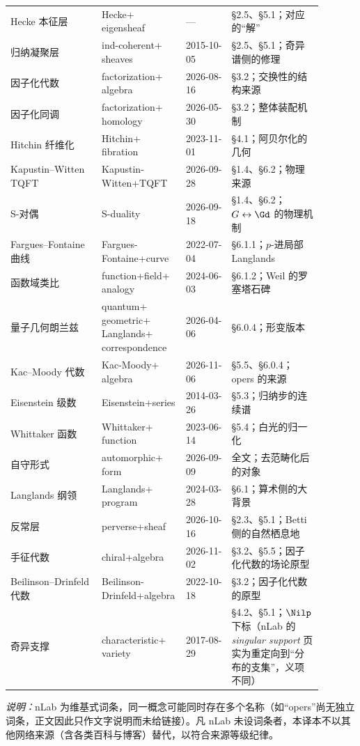 {\begin{longtable}{@{}>{\raggedright\arraybackslash}p{0.26\linewidth}>{\raggedright\arraybackslash}p{0.24\linewidth}>{\raggedright\arraybackslash}p{0.13\linewidth}>{\raggedright\arraybackslash}p{0.26\linewidth}@{}}
Hecke 本征层 & Hecke+​\allowbreak eigensheaf & — & §2.5、§5.1；对应的“解” \\
归纳凝聚层 & ind-coherent+​\allowbreak sheaves & \mbox{2015-10-05} & §2.5、§5.1；奇异谱侧的修理 \\
因子化代数 & factorization+​\allowbreak algebra & \mbox{2026-08-16} & §3.2；交换性的结构来源 \\
因子化同调 & factorization+​\allowbreak homology & \mbox{2026-05-30} & §3.2；整体装配机制 \\
Hitchin 纤维化 & Hitchin+​\allowbreak fibration & \mbox{2023-11-01} & §4.1；阿贝尔化的几何 \\
Kapustin--Witten TQFT & Kapustin-Witten+​\allowbreak TQFT & \mbox{2026-09-28} & §1.4、§6.2；物理来源 \\
S-对偶 & S-duality & \mbox{2026-09-18} & §1.4、§6.2；$G\leftrightarrow\Gd$ 的物理机制 \\
Fargues--Fontaine 曲线 & Fargues-Fontaine+​\allowbreak curve & \mbox{2022-07-04} & §6.1.1；$p$-进局部 Langlands \\
函数域类比 & function+​\allowbreak field+​\allowbreak analogy & \mbox{2024-06-03} & §6.1.2；Weil 的罗塞塔石碑 \\
量子几何朗兰兹 & quantum+​\allowbreak geometric+​\allowbreak Langlands+​\allowbreak correspondence & \mbox{2026-04-06} & §6.0.4；形变版本 \\
Kac--Moody 代数 & Kac-Moody+​\allowbreak algebra & \mbox{2026-11-06} & §5.5、§6.0.4；opers 的来源 \\
Eisenstein 级数 & Eisenstein+​\allowbreak series & \mbox{2014-03-26} & §5.3；归纳步的连续谱 \\
Whittaker 函数 & Whittaker+​\allowbreak function & \mbox{2023-06-14} & §5.4；白光的归一化 \\
自守形式 & automorphic+​\allowbreak form & \mbox{2026-09-09} & 全文；去范畴化后的对象 \\
Langlands 纲领 & Langlands+​\allowbreak program & \mbox{2024-03-28} & §6.1；算术侧的大背景 \\
反常层 & perverse+​\allowbreak sheaf & \mbox{2026-10-16} & §2.3、§5.1；Betti 侧的自然栖息地 \\
手征代数 & chiral+​\allowbreak algebra & \mbox{2026-11-02} & §3.2、§5.5；因子化代数的场论原型 \\
Beilinson--Drinfeld 代数 & Beilinson-Drinfeld+​\allowbreak algebra & \mbox{2022-10-18} & §3.2；因子化代数的原型 \\
奇异支撑 & characteristic+​\allowbreak variety & \mbox{2017-08-29} & §4.2、§5.1；$\Nilp$ 下标（nLab 的 \emph{singular support} 页实为重定向到“分布的支集”，义项不同） \\
\end{longtable}
}

\noindent\textit{说明：}nLab 为维基式词条，同一概念可能同时存在多个名称（如“opers”尚无独立词条，正文因此只作文字说明而未给链接）。凡 nLab 未设词条者，本译本不以其他网络来源（含各类百科与博客）替代，以符合来源等级纪律。
